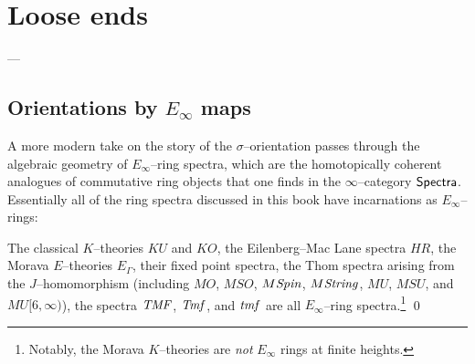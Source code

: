 
\chapter{Loose ends}

---


\section{Orientations by \texorpdfstring{$E_\infty$}{Eoo} maps}

A more modern take on the story of the $\sigma$--orientation passes through the algebraic geometry of $E_\infty$--ring spectra, which are the homotopically coherent analogues of commutative ring objects that one finds in the $\infty$--category $\mathsf{Spectra}$.  Essentially all of the ring spectra discussed in this book have incarnations as $E_\infty$--rings:
\begin{theorem}
The classical $K$--theories $KU$ and $KO$, the Eilenberg--Mac Lane spectra $HR$, the Morava $E$--theories $E_\Gamma$, their fixed point spectra, the Thom spectra arising from the $J$--homomorphism (including $MO$, $MSO$, $M\mathit{Spin}$, $M\mathit{String}$, $MU$, $MSU$, and $MU[6, \infty)$), the spectra $\mathit{TMF}$, $\mathit{Tmf}$, and $\mathit{tmf}$ are all $E_\infty$--ring spectra.\footnote{Notably, the Morava $K$--theories are \emph{not} $E_\infty$ rings at finite heights.} \qed
\end{theorem}

